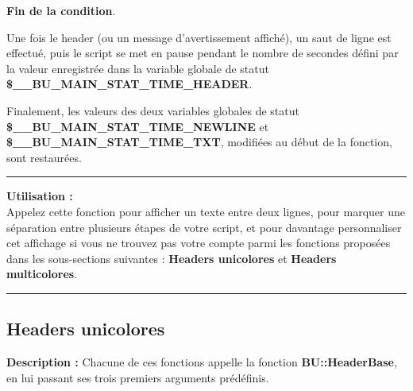 \documentclass[a4paper,10pt]{article}
\begin{document}
\begin{justify}
    \textbf{\color{brick}Fin de la condition}.
\end{justify}

\setlength{\parskip}{2em}


\begin{justify}
    Une fois le header (ou un message d'avertissement affiché), un saut de ligne est effectué, puis le script se met en pause pendant le nombre de secondes défini par la valeur enregistrée dans la variable globale de statut \textbf{\color{orange}\$\_\_BU\_MAIN\_STAT\_TIME\_HEADER}.
\end{justify}

\setlength{\parskip}{2em}

\begin{justify}
    Finalement, les valeurs des deux variables globales de statut \textbf{\color{orange}\$\_\_BU\_MAIN\_STAT\_TIME\_NEWLINE} et \textbf{\color{orange}\$\_\_BU\_MAIN\_STAT\_TIME\_TXT}, modifiées au début de la fonction, sont restaurées.
\end{justify}

\setlength{\parskip}{1em}

\par\noindent\rule{\textwidth}{0.4pt}

\begin{justify}
    \textbf{Utilisation :}\\[1\baselineskip]
    Appelez cette fonction pour afficher un texte entre deux lignes, pour marquer une séparation entre plusieurs étapes de votre script, et pour davantage personnaliser cet affichage si vous ne trouvez pas votre compte parmi les fonctions proposées dans les sous-sections suivantes : \textbf{\color{green}Headers unicolores} et \textbf{\color{green}Headers multicolores}.
\end{justify}




\color{green}\par\noindent\rule{\textwidth}{0.4pt}\color{white}

\color{green}
\subsection{Headers unicolores}\color{white}

\begin{justify}
    \textbf{Description :}
    Chacune de ces fonctions appelle la fonction \textbf{\color{mauve}BU::HeaderBase}, en lui passant ses trois premiers arguments prédéfinis.
\end{justify}
\end{document}
